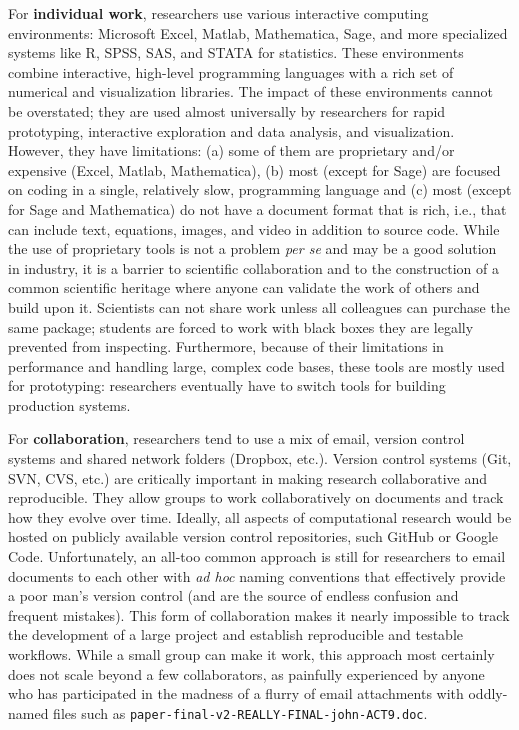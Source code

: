 \documentclass[ChapterTOCs,krantz2]{krantz} %
\begin{document}
For \textbf{individual work}, researchers use various interactive computing
environments: Microsoft Excel, Matlab, Mathematica, Sage, and more specialized
systems like R, SPSS, SAS, and STATA for statistics. These environments combine
interactive, high-level programming languages with a rich set of numerical and
visualization libraries. The impact of these environments cannot be overstated;
they are used almost universally by researchers for rapid prototyping,
interactive exploration and data analysis, and visualization. However, they
have limitations: (a) some of them are proprietary and/or expensive (Excel,
Matlab, Mathematica), (b) most (except for Sage) are focused on coding in a
single, relatively slow, programming language and (c) most (except for Sage and
Mathematica) do not have a document format that is rich, i.e., that can include
text, equations, images, and video in addition to source code. While the use of
proprietary tools is not a problem \emph{per se} and may be a good solution in
industry, it is a barrier to scientific collaboration and to the construction
of a common scientific heritage where anyone can validate the work of others
and build upon it.  Scientists can not share work unless all colleagues can
purchase the same package; students are forced to work with black boxes they
are legally prevented from inspecting. Furthermore, because of their
limitations in performance and handling large, complex code bases, these tools
are mostly used for prototyping: researchers eventually have to switch tools
for building production systems.

For \textbf{collaboration}, researchers tend to use a mix of email, version
control systems and shared network folders (Dropbox, etc.).  Version control
systems (Git, SVN, CVS, etc.) are critically important in making research
collaborative and reproducible. They allow groups to work collaboratively on
documents and track how they evolve over time. Ideally, all aspects of
computational research would be hosted on publicly available version control
repositories, such GitHub or Google Code. Unfortunately, an all-too common
approach is still for researchers to email documents to each other with
\emph{ad hoc} naming conventions that effectively provide a poor man's version
control (and are the source of endless confusion and frequent mistakes). This
form of collaboration makes it nearly impossible to track the development of a
large project and establish reproducible and testable workflows.  While a
small group can make it work, this approach most certainly
does not scale beyond a few collaborators, as painfully experienced by anyone
who has participated in the madness of a flurry of email attachments with
oddly-named files such as {\tt paper-final-v2-REALLY-FINAL-john-ACT9.doc}.
\end{document}
